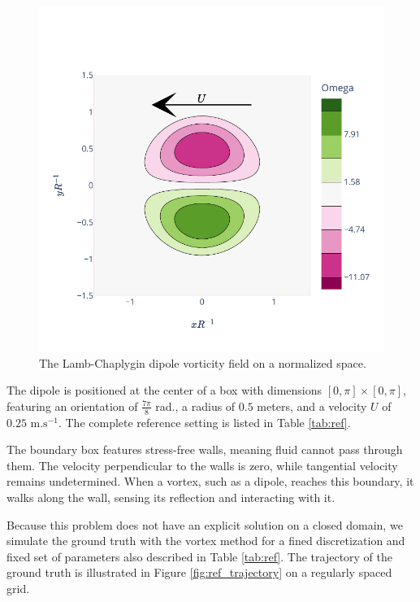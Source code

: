 \begin{figure}[ht]
    \centering
    \includegraphics[width=0.6\linewidth]{images/app2d/lamb.pdf}
    \caption{The Lamb-Chaplygin dipole vorticity field on a normalized space.}
    \label{fig:lamb_dipole}
\end{figure}

The dipole is positioned at the center of a box with dimensions $[0, \pi] \times [0, \pi]$, featuring an orientation of $\frac{7\pi}{8}$ rad., a radius of $0.5$ meters, and a velocity $U$ of $0.25 \text{ m.s}^{-1}$. The complete reference setting is listed in Table \ref{tab:ref}.

The boundary box features stress-free walls, meaning fluid cannot pass through them. The velocity perpendicular to the walls is zero, while tangential velocity remains undetermined. When a vortex, such as a dipole, reaches this boundary, it walks along the wall, sensing its reflection and interacting with it.

Because this problem does not have an explicit solution on a closed domain, we simulate the ground truth with the vortex method for a fined discretization and fixed set of parameters also described in Table \ref{tab:ref}. The trajectory of the ground truth is illustrated in Figure \ref{fig:ref_trajectory} on a regularly spaced grid.

